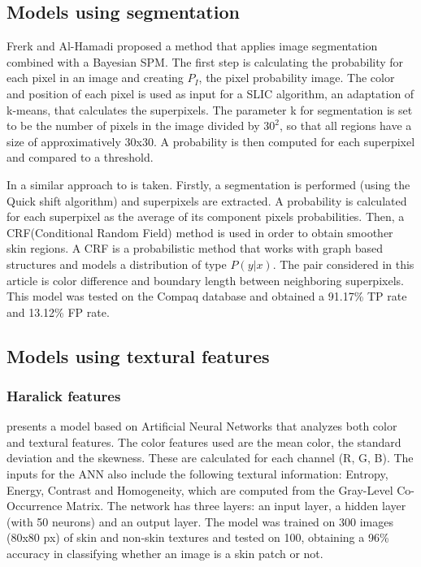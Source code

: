 \documentclass[12pt]{report}
\begin{document}
 	\subsection{Models using segmentation}
 	Frerk and Al-Hamadi\cite{superpixels_applied_1} proposed a method that applies image segmentation combined with a Bayesian SPM. The first step is calculating the probability for each pixel in an image and creating \(P_I\), the pixel probability image. The color and position of each pixel is used as input for a SLIC algorithm, an adaptation of k-means, that calculates the superpixels. The parameter k for segmentation is set to be the number of pixels in the image divided by \(30^2\), so that all regions have a size of approximatively 30x30. A probability is then computed for each superpixel and compared to a threshold.
 	
 	In \cite{superpixels_applied_2} a similar approach to \cite{superpixels_applied_1} is taken. Firstly, a segmentation is performed (using the Quick shift algorithm) and superpixels are extracted. A probability is calculated for each superpixel as the average of its component pixels probabilities. Then, a CRF(Conditional Random Field) method is used in order to obtain smoother skin regions. A CRF is a probabilistic method that works with graph based structures and models a distribution of type $P(y|x)$. The pair considered in this article is color difference and boundary length between neighboring superpixels. This model was tested on the Compaq database and obtained a 91.17\% TP rate and 13.12\% FP rate.
 	
 	\subsection{Models using textural features}
 	
 	\subsubsection{Haralick features}
 	\cite{color_texture_ann} presents a model based on Artificial Neural Networks that analyzes both color and textural features. The color features used are the mean color, the standard deviation and the skewness. These are calculated for each channel (R, G, B). The inputs for the ANN also include the following textural information: Entropy, Energy, Contrast and Homogeneity, which are computed from the Gray-Level Co-Occurrence Matrix. The network has three layers: an input layer, a hidden layer (with 50 neurons) and an output layer. The model was trained on 300 images (80x80 px) of skin and non-skin textures and tested on 100, obtaining a 96\% accuracy in classifying whether an image is a skin patch or not.
 	
\end{document}
